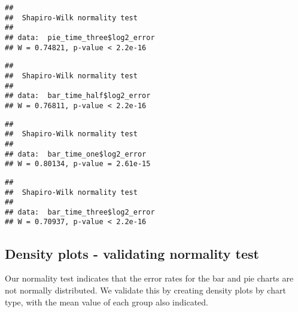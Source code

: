 \documentclass[]{article}
\newenvironment{Shaded}{\begin{snugshade}}{\end{snugshade}}
\newcommand{\KeywordTok}[1]{\textcolor[rgb]{0.13,0.29,0.53}{\textbf{{#1}}}}
\newcommand{\NormalTok}[1]{{#1}}
\begin{document}
\begin{verbatim}
## 
##  Shapiro-Wilk normality test
## 
## data:  pie_time_three$log2_error
## W = 0.74821, p-value < 2.2e-16
\end{verbatim}

\begin{Shaded}
\end{Shaded}

\begin{verbatim}
## 
##  Shapiro-Wilk normality test
## 
## data:  bar_time_half$log2_error
## W = 0.76811, p-value < 2.2e-16
\end{verbatim}

\begin{Shaded}
\end{Shaded}

\begin{verbatim}
## 
##  Shapiro-Wilk normality test
## 
## data:  bar_time_one$log2_error
## W = 0.80134, p-value = 2.61e-15
\end{verbatim}

\begin{Shaded}
\end{Shaded}

\begin{verbatim}
## 
##  Shapiro-Wilk normality test
## 
## data:  bar_time_three$log2_error
## W = 0.70937, p-value < 2.2e-16
\end{verbatim}

\subsection{Density plots - validating normality
test}\label{density-plots---validating-normality-test}

Our normality test indicates that the error rates for the bar and pie
charts are not normally distributed. We validate this by creating
density plots by chart type, with the mean value of each group also
indicated.
\end{document}
